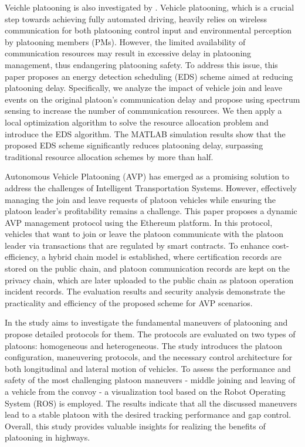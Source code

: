 Veichle platooning is also investigated by \cite{lit_3}. Vehicle platooning, which is a crucial step towards achieving fully automated driving, heavily relies on wireless communication for both platooning control input and environmental perception by platooning members (PMs). However, the limited availability of communication resources may result in excessive delay in platooning management, thus endangering platooning safety. To address this issue, this paper proposes an energy detection scheduling (EDS) scheme aimed at reducing platooning delay. Specifically, we analyze the impact of vehicle join and leave events on the original platoon's communication delay and propose using spectrum sensing to increase the number of communication resources. We then apply a local optimization algorithm to solve the resource allocation problem and introduce the EDS algorithm. The MATLAB simulation results show that the proposed EDS scheme significantly reduces platooning delay, surpassing traditional resource allocation schemes by more than half.


Autonomous Vehicle Platooning (AVP) has emerged as a promising solution to address the challenges of Intelligent Transportation Systems. However, effectively managing the join and leave requests of platoon vehicles while ensuring the platoon leader's profitability remains a challenge. This paper \cite{lit_4} proposes a dynamic AVP management protocol using the Ethereum platform. In this protocol, vehicles that want to join or leave the platoon communicate with the platoon leader via transactions that are regulated by smart contracts. To enhance cost-efficiency, a hybrid chain model is established, where certification records are stored on the public chain, and platoon communication records are kept on the privacy chain, which are later uploaded to the public chain as platoon operation incident records. The evaluation results and security analysis demonstrate the practicality and efficiency of the proposed scheme for AVP scenarios.


In \cite{lit_5} the study aims to investigate the fundamental maneuvers of platooning and propose detailed protocols for them. The protocols are evaluated on two types of platoons: homogeneous and heterogeneous. The study introduces the platoon configuration, maneuvering protocols, and the necessary control architecture for both longitudinal and lateral motion of vehicles. To assess the performance and safety of the most challenging platoon maneuvers - middle joining and leaving of a vehicle from the convoy - a visualization tool based on the Robot Operating System (ROS) is employed. The results indicate that all the discussed maneuvers lead to a stable platoon with the desired tracking performance and gap control. Overall, this study provides valuable insights for realizing the benefits of platooning in highways.